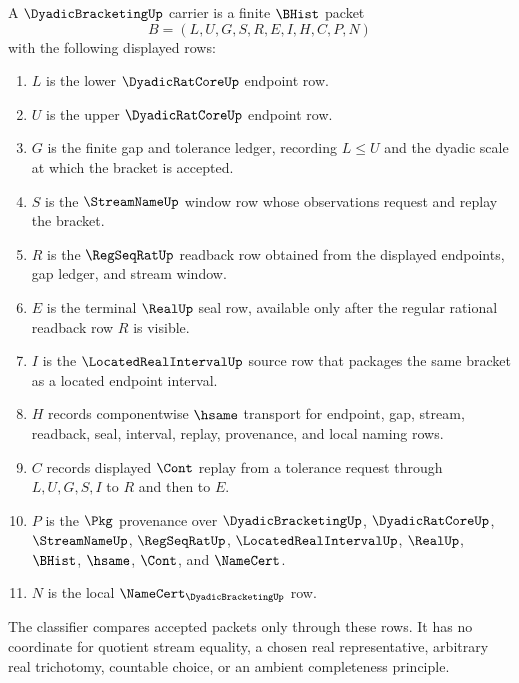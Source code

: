 \begin{definition}
\label{def:dyadic-bracketing-carrier}
A $\DyadicBracketingUp$ carrier is a finite $\BHist$ packet
$$
B=(L,U,G,S,R,E,I,H,C,P,N)
$$
with the following displayed rows:
\begin{enumerate}
\item $L$ is the lower $\DyadicRatCoreUp$ endpoint row.
\item $U$ is the upper $\DyadicRatCoreUp$ endpoint row.
\item $G$ is the finite gap and tolerance ledger, recording $L \leq U$ and the dyadic scale at which the bracket is accepted.
\item $S$ is the $\StreamNameUp$ window row whose observations request and replay the bracket.
\item $R$ is the $\RegSeqRatUp$ readback row obtained from the displayed endpoints, gap ledger, and stream window.
\item $E$ is the terminal $\RealUp$ seal row, available only after the regular rational readback row $R$ is visible.
\item $I$ is the $\LocatedRealIntervalUp$ source row that packages the same bracket as a located endpoint interval.
\item $H$ records componentwise $\hsame$ transport for endpoint, gap, stream, readback, seal, interval, replay, provenance, and local naming rows.
\item $C$ records displayed $\Cont$ replay from a tolerance request through $L,U,G,S,I$ to $R$ and then to $E$.
\item $P$ is the $\Pkg$ provenance over $\DyadicBracketingUp$, $\DyadicRatCoreUp$, $\StreamNameUp$, $\RegSeqRatUp$, $\LocatedRealIntervalUp$, $\RealUp$, $\BHist$, $\hsame$, $\Cont$, and $\NameCert$.
\item $N$ is the local $\NameCert_{\DyadicBracketingUp}$ row.
\end{enumerate}
The classifier compares accepted packets only through these rows. It has no coordinate for quotient stream equality, a chosen real representative, arbitrary real trichotomy, countable choice, or an ambient completeness principle.
\end{definition}

